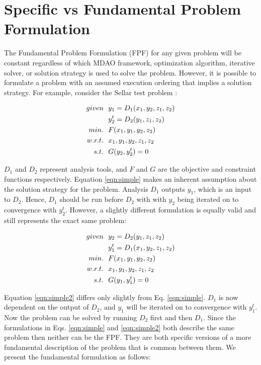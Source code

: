 \section{Specific vs Fundamental Problem Formulation }
    \label{sec:spg_vs_fpg}

    The Fundamental Problem Formulation (FPF) for any given problem will be constant regardless 
    of which MDAO framework, optimization algorithm, iterative solver, or solution strategy
    is used to solve the problem. However, it is possible to formulate a problem
    with an assumed execution ordering that implies a solution strategy. 
    For example, consider the Sellar test problem \cite{AIAA:sellar}: 

    \begin{align}
        given & \ \ y_1 = D_1(x_1,y_2,z_1,z_2) \notag
        \\      & \ \ y_2^t = D_2(y_1,z_1,z_2) \notag
        \\min. &\ \ F(x_1,y_1,y_2,z_2) \notag
        \\w.r.t. & \ \ x_1,y_1,y_2,z_1,z_2 \notag
        \\s.t. & \ \ G(y_2,y_2^t) = 0
        \label{eqn:simple}
    \end{align}

    $D_1$ and $D_2$ represent analysis tools, and $F$ and $G$ are the objective 
    and constraint functions respectively. Equation \ref{eqn:simple} makes an 
    inherent assumption about the solution strategy for the problem. Analysis 
    $D_1$ outputs $y_1$, which is an input to $D_2$. Hence, $D_1$ should be run 
    before $D_2$ with with $y_2$ being iterated on to convergence with $y_2^t$. 
    However, a slightly different formulation is equally valid and still 
    represents the exact same problem: 

    \begin{align}
        given & \ \ y_2 = D_2(y_1,z_1,z_2) \notag
        \\      & \ \ y_1^t = D_1(x_1,y_2,z_1,z_2) \notag
        \\min. &\ \ F(x_1,y_1,y_2,z_2) \notag
        \\w.r.t. & \ \ x_1,y_1,y_2,z_1,z_2 \notag
        \\s.t. & \ \ G(y_1,y_1^t) = 0
        \label{eqn:simple}
    \end{align}

    Equation \ref{eqn:simple2} differs only slightly from Eq. \ref{eqn:simple}. 
    $D_1$ is now dependent on the output of $D_2$, and $y_1$ will be iterated on to 
    convergence with $y_1^t$. Now the problem can be solved by running $D_2$ first 
    and then $D_1$. Since the formulations in Eqs. \ref{eqn:simple} and 
    \ref{eqn:simple2} both describe the same problem then neither can be the
    FPF. They are both specific versions of a more fundamental description of 
    the problem that is common between them. We present the fundamental 
    formulation as follows: 

